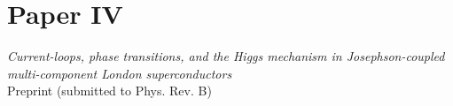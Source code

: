 \documentclass[11pt,b5paper,onecolumn,titlepage,openright,twoside,final]{book}
\begin{document}
\chapter*{Paper IV}
\centering \textit{Current-loops, phase transitions, and the Higgs mechanism in Josephson-coupled
multi-component London superconductors}\\
\bigskip
\centering Preprint (submitted to Phys. Rev. B)
\cleardoublepage

\end{document}
